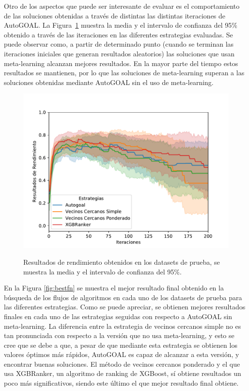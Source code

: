 Otro de los aspectos que puede ser interesante de evaluar es el comportamiento de las soluciones obtenidas a través de distintas las distintas iteraciones de AutoGOAL. La Figura~\ref{fig:performance} muestra la media y el intervalo de confianza del 95\% obtenido a través de las iteraciones en las diferentes estrategias evaluadas. Se puede observar como, a partir de determinado punto (cuando se terminan las iteraciones iniciales que generan resultados aleatorios) las soluciones que usan meta-learning alcanzan mejores resultados. En la mayor parte del tiempo estos resultados se mantienen, por lo que las soluciones de meta-learning superan a las soluciones obtenidas mediante AutoGOAL sin el uso de meta-learning.

\begin{figure}[H]
\centering
\includegraphics[scale=.75]{Figures/performance}
\label{fig:performance}
\caption{Resultados de rendimiento obtenidos en los datasets de prueba, se muestra la media y el intervalo de confianza del 95\%.}
\end{figure}

En la Figura \ref{fig:bestfn} se muestra el mejor resultado final obtenido en la búsqueda de los flujos de algoritmos en cada uno de los datasets de prueba para las diferentes estrategias. Como se puede apreciar, se obtienen mejores resultados finales en cada uno de las estrategias seguidas con respecto a AutoGOAL sin meta-learning. La diferencia entre la estrategia de vecinos cercanos simple no es tan pronunciada con respecto a  la versión que no usa meta-learning, y esto se cree que se debe a que, a pesar de que mediante esta estrategia se obtienen los valores óptimos más rápidos, AutoGOAL es capaz de alcanzar a esta versión, y encontrar buenas soluciones. El método de vecinos cercanos ponderado y el que usa XGBRanker, un algoritmo de ranking de XGBoost, sí obtiene resultados un poco más significativos, siendo este último el que mejor resultado final obtiene.

